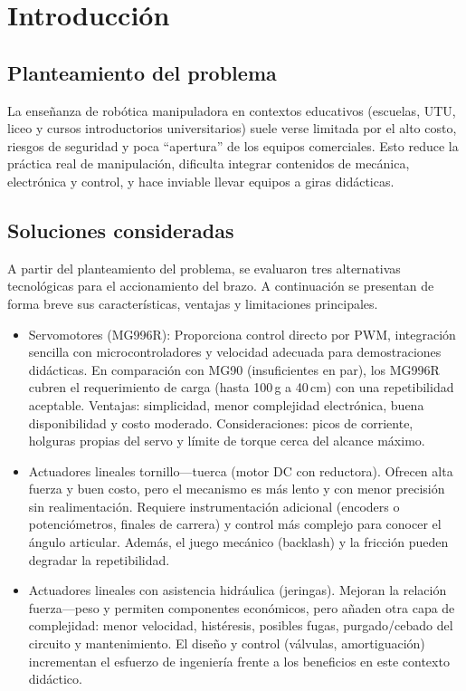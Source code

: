 \section{Introducción}
\subsection{Planteamiento del problema}
La enseñanza de robótica manipuladora en contextos educativos (escuelas, UTU, liceo y cursos introductorios universitarios) suele verse limitada por el alto costo, riesgos de seguridad y poca “apertura” de los equipos comerciales. Esto reduce la práctica real de manipulación, dificulta integrar contenidos de mecánica, electrónica y control, y hace inviable llevar equipos a giras didácticas.

\subsection{Soluciones consideradas}
A partir del planteamiento del problema, se evaluaron tres alternativas tecnológicas para el accionamiento del brazo. A continuación se presentan de forma breve sus características, ventajas y limitaciones principales.

\begin{itemize}
  \item Servomotores (MG996R): Proporciona control directo por PWM, integración sencilla con microcontroladores y velocidad adecuada para demostraciones didácticas. En comparación con MG90 (insuficientes en par), los MG996R cubren el requerimiento de carga (hasta 100\,g a 40\,cm) con una repetibilidad aceptable. Ventajas: simplicidad, menor complejidad electrónica, buena disponibilidad y costo moderado. Consideraciones: picos de corriente, holguras propias del servo y límite de torque cerca del alcance máximo.
  
  \item Actuadores lineales tornillo---tuerca (motor DC con reductora). Ofrecen alta fuerza y buen costo, pero el mecanismo es más lento y con menor precisión sin realimentación. Requiere instrumentación adicional (encoders o potenciómetros, finales de carrera) y control más complejo para conocer el ángulo articular. Además, el juego mecánico (backlash) y la fricción pueden degradar la repetibilidad.
  
  \item Actuadores lineales con asistencia hidráulica (jeringas). Mejoran la relación fuerza---peso y permiten componentes económicos, pero añaden otra capa de complejidad: menor velocidad, histéresis, posibles fugas, purgado/cebado del circuito y mantenimiento. El diseño y control (válvulas, amortiguación) incrementan el esfuerzo de ingeniería frente a los beneficios en este contexto didáctico.
\end{itemize}


